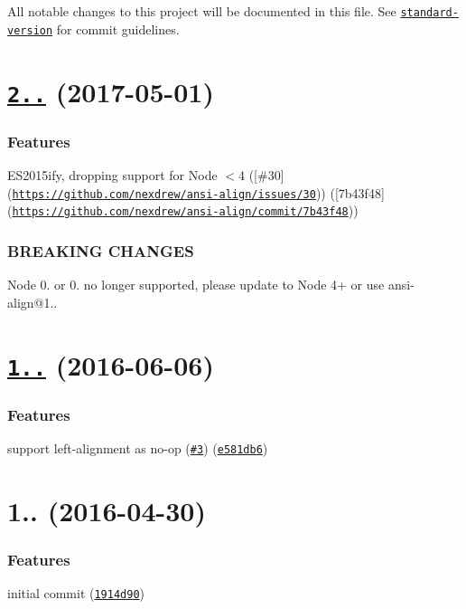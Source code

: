All notable changes to this project will be documented in this file. See \href{https://github.com/conventional-changelog/standard-version}{\tt standard-\/version} for commit guidelines.

\label{_2.0.0}%
 \section*{\href{https://github.com/nexdrew/ansi-align/compare/v1.1.0...v2.0.0}{\tt 2..} (2017-\/05-\/01)}

\subsubsection*{Features}


\begin{DoxyItemize}
\item E\+S2015ify, dropping support for Node $<$4 (\mbox{[}\#30\mbox{]}(\href{https://github.com/nexdrew/ansi-align/issues/30}{\tt https\+://github.\+com/nexdrew/ansi-\/align/issues/30})) (\mbox{[}7b43f48\mbox{]}(\href{https://github.com/nexdrew/ansi-align/commit/7b43f48}{\tt https\+://github.\+com/nexdrew/ansi-\/align/commit/7b43f48}))
\end{DoxyItemize}

\subsubsection*{B\+R\+E\+A\+K\+I\+NG C\+H\+A\+N\+G\+ES}


\begin{DoxyItemize}
\item Node 0. or 0. no longer supported, please update to Node 4+ or use ansi-\/align@1..
\end{DoxyItemize}

\label{_1.1.0}%
 \section*{\href{https://github.com/nexdrew/ansi-align/compare/v1.0.0...v1.1.0}{\tt 1..} (2016-\/06-\/06)}

\subsubsection*{Features}


\begin{DoxyItemize}
\item support left-\/alignment as no-\/op (\href{https://github.com/nexdrew/ansi-align/issues/3}{\tt \#3}) (\href{https://github.com/nexdrew/ansi-align/commit/e581db6}{\tt e581db6})
\end{DoxyItemize}

\label{_1.0.0}%
 \section*{1.. (2016-\/04-\/30)}

\subsubsection*{Features}


\begin{DoxyItemize}
\item initial commit (\href{https://github.com/nexdrew/ansi-align/commit/1914d90}{\tt 1914d90}) 
\end{DoxyItemize}